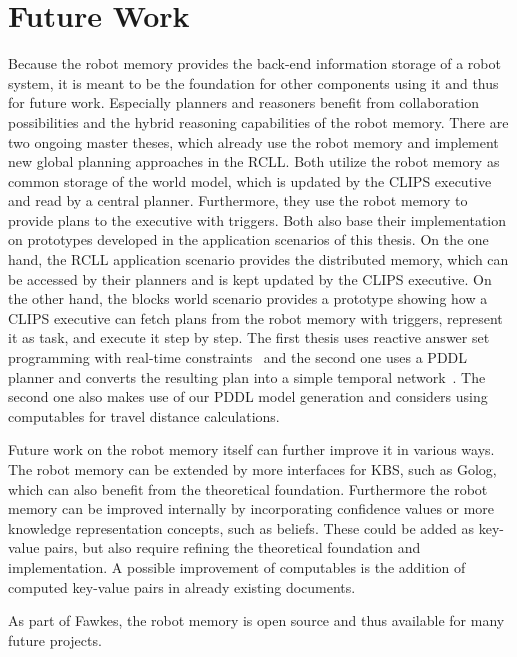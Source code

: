 \section{Future Work}
\label{sec:future-work}
Because the robot memory provides the back-end information storage of
a robot system, it is meant to be the foundation for other components
using it and thus for future work. Especially planners and reasoners
benefit from collaboration possibilities and the hybrid reasoning
capabilities of the robot memory. There are two ongoing master theses,
which already use the robot memory and implement new global planning
approaches in the RCLL. Both utilize the robot memory as common
storage of the world model, which is updated by the CLIPS executive
and read by a central planner. Furthermore, they use the robot memory
to provide plans to the executive with triggers. Both also base their
implementation on prototypes developed in the application scenarios of
this thesis. On the one hand, the RCLL application scenario provides
the distributed memory, which can be accessed by their planners and is
kept updated by the CLIPS executive. On the other hand, the blocks
world scenario provides a prototype showing how a CLIPS executive can
fetch plans from the robot memory with triggers, represent it as task,
and execute it step by step. The first thesis uses reactive answer set
programming with real-time constraints~\cite{bjoern-thesis} and the
second one uses a PDDL planner and converts the resulting plan into a
simple temporal network~\cite{matthias-thesis}. The second one also
makes use of our PDDL model generation and considers using
computables for travel distance calculations.

Future work on the robot memory itself can further improve it in
various ways. The robot memory can be extended by more interfaces for
KBS, such as Golog, which can also benefit from the theoretical
foundation. Furthermore the robot memory can be improved internally by
incorporating confidence values or more knowledge representation
concepts, such as beliefs. These could be added as key-value pairs,
but also require refining the theoretical foundation and
implementation. A possible improvement of computables is the addition
of computed key-value pairs in already existing documents.

As part of Fawkes, the robot memory is open source and thus available
for many future projects.
